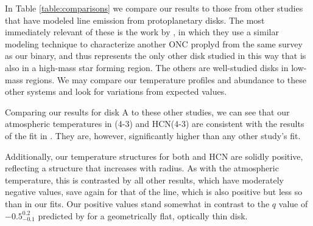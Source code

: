 



In Table \ref{table:comparisons} we compare our results to those from other studies that have modeled line emission from protoplanetary disks. The most immediately relevant of these is the work by \citet{Factor2017}, in which they use a similar modeling technique to characterize another ONC proplyd from the same survey as our binary, and thus represents the only other disk studied in this way that is also in a high-mass star forming region. The others are well-studied disks in low-mass regions. We may compare our temperature profiles and abundance to these other systems and look for variations from expected values.

Comparing our results for disk A to these other studies, we can see that our atmospheric temperatures in \hco(4-3) and HCN(4-3) are consistent with the results of the \hco fit in \citet{Factor2017}. They are, however, significantly higher than any other study's fit.


Additionally, our temperature structures for both \hco and HCN are solidly positive, reflecting a structure that increases with radius. As with the atmospheric temperature, this is contrasted by all other results, which have moderately negative values, save again for that of the \citet{Factor2017} \hco line, which is also positive but less so than in our fits. Our positive values stand somewhat in contrast to the $q$ value of $-0.5_{-0.1}^{0.2}$ predicted by \citet{Dartois2003} for a geometrically flat, optically thin disk.


